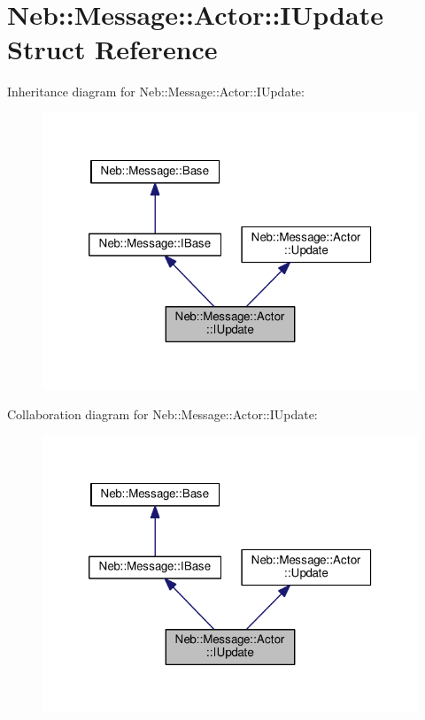 \hypertarget{structNeb_1_1Message_1_1Actor_1_1IUpdate}{\section{Neb\-:\-:Message\-:\-:Actor\-:\-:I\-Update Struct Reference}
\label{structNeb_1_1Message_1_1Actor_1_1IUpdate}
}


Inheritance diagram for Neb\-:\-:Message\-:\-:Actor\-:\-:I\-Update\-:
\nopagebreak
\begin{figure}[H]
\begin{center}
\leavevmode
\includegraphics[width=320pt]{structNeb_1_1Message_1_1Actor_1_1IUpdate__inherit__graph}
\end{center}
\end{figure}


Collaboration diagram for Neb\-:\-:Message\-:\-:Actor\-:\-:I\-Update\-:
\nopagebreak
\begin{figure}[H]
\begin{center}
\leavevmode
\includegraphics[width=320pt]{structNeb_1_1Message_1_1Actor_1_1IUpdate__coll__graph}
\end{center}
\end{figure}
